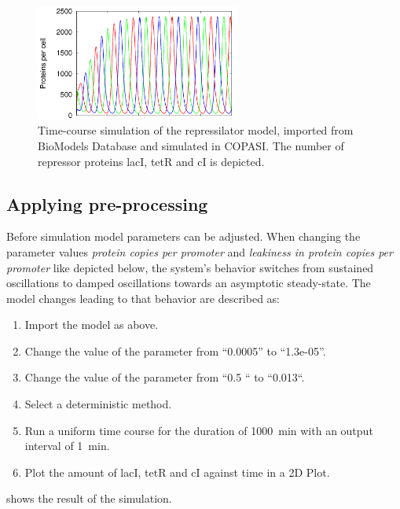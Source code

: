 \begin{figure}[ht]
	\centering
	\includegraphics[width=0.6\textwidth]{examples/rep_tc.png}
	\caption{Time-course simulation of the repressilator model, imported from BioModels Database and simulated in COPASI. The number of repressor proteins lacI, tetR and cI is depicted.}
	\label{fig:rep_tc}
\end{figure}


\subsection{Applying pre-processing}
\label{sec:preprocessing}
Before simulation model parameters can be adjusted. When changing the parameter values \emph{protein copies per promoter}  and \emph{leakiness in protein copies per promoter}  like depicted below, the system's behavior switches from sustained oscillations to damped oscillations towards an asymptotic steady-state. The model changes leading to that behavior are described as: 

\begin{enumerate}
	\item{Import the model as above.}
	\item{Change the value of the parameter  from “0.0005” to “1.3e-05”.}
	\item{Change the value of the parameter  from “0.5 “ to “0.013“.}
	\item{Select a deterministic method.}
	\item{Run a uniform time course for the duration of 1000~min with an output interval of 1~min.}
	\item Plot the amount of lacI, tetR and cI against time in a 2D Plot.
\end{enumerate}

 shows the result of the simulation.

